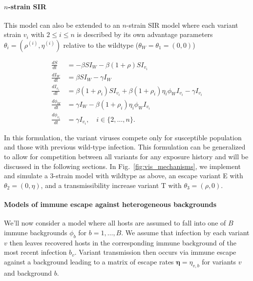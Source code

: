 \documentclass[11pt,oneside,letterpaper]{article}
\renewcommand{\vec}[1]{\boldsymbol{#1}}
\newcommand{\wt}{W}
\newcommand{\varEscape}{\eta}
\newcommand{\varTransmission}{\rho}
\begin{document}
\paragraph{$n$-strain SIR}%

This model can also be extended to an $n$-strain SIR model where each variant strain $v_i$ with $2\leq i \leq n$ is described by its own advantage parameters $\theta_{i} = (\varTransmission^{(i)}, \varEscape ^{(i)})$  relative to the wildtype ($\theta_{\wt} = \theta_{1} = (0, 0)$)

\begin{align}
    \frac{d S}{d t} &= - \beta S I_{\wt} - \beta (1+\varTransmission) S I_{v_{i}}\\
    \frac{d I_{\wt}}{dt} &= \beta S I_{\wt} - \gamma I_{\wt}\\
    \frac{d I_{v_{i}}}{dt} &= \beta (1+\varTransmission_i) S I_{v_{i}} + \beta (1+\varTransmission_i) \varEscape_i \phi_{\wt} I_{v_{i}} - \gamma I_{v_{i}}\\
    \frac{d \phi_{\wt}}{dt} &= \gamma I_{\wt} - \beta (1+\varTransmission_i) \varEscape_i \phi_{\wt} I_{v_{i}}\\
    \frac{d \phi_{v_{i}}}{dt} &= \gamma I_{v_{i}}, \quad i \in \{2, \ldots, n\}.
\end{align}

In this formulation, the variant viruses compete only for susceptible population and those with previous wild-type infection.
This formulation can be generalized to allow for competition between all variants for any exposure history and will be discussed in the following sections.
In Fig.~\ref{fig:vis_mechanisms}, we implement and simulate a 3-strain model with wildtype as above, an escape variant E with $\theta_{2} = (0, \varEscape)$, and a transmissibility increase variant T with $\theta_{3} = (\varTransmission, 0)$.

\paragraph{Models of immune escape against heterogeneous backgrounds}%

We'll now consider a model where all hosts are assumed to fall into one of $B$ immune backgrounds $\phi_{b}$ for $b =1, \ldots, B$.
We assume that infection by each variant $v$ then leaves recovered hosts in the corresponding immune background of the most recent infection $b_{v}$.
Variant transmission then occurs via immune escape against a background leading to a matrix of escape rates $\vec{\varEscape} = \varEscape_{v,b}$ for variants $v$ and background $b$.
\end{document}
